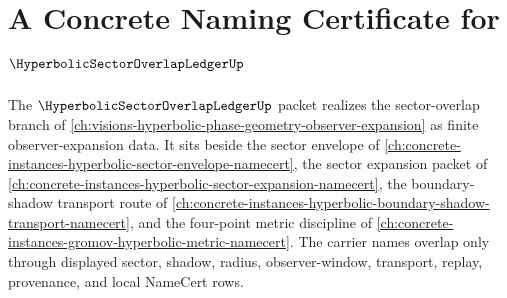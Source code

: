 \chapter{A Concrete Naming Certificate for $\HyperbolicSectorOverlapLedgerUp$}
\label{ch:concrete-instances-hyperbolic-sector-overlap-ledger-namecert}

The $\HyperbolicSectorOverlapLedgerUp$ packet realizes the sector-overlap branch of \autoref{ch:visions-hyperbolic-phase-geometry-observer-expansion} as finite observer-expansion data. It sits beside the sector envelope of \autoref{ch:concrete-instances-hyperbolic-sector-envelope-namecert}, the sector expansion packet of \autoref{ch:concrete-instances-hyperbolic-sector-expansion-namecert}, the boundary-shadow transport route of \autoref{ch:concrete-instances-hyperbolic-boundary-shadow-transport-namecert}, and the four-point metric discipline of \autoref{ch:concrete-instances-gromov-hyperbolic-metric-namecert}. The carrier names overlap only through displayed sector, shadow, radius, observer-window, transport, replay, provenance, and local NameCert rows.

